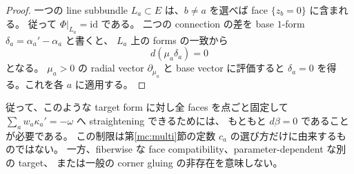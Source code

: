 \begin{proof}
一つの line subbundle $L_a\subset E$ は、$b\ne a$ を選べば face $\{z_b=0\}$ に含まれる。
従って $\Phi|_{L_a}=\mathrm{id}$ である。
二つの connection の差を base $1$-form $\delta_a=\alpha_a'-\alpha_a$ と書くと、
$L_a$ 上の forms の一致から
\[
 d(\mu_a\delta_a)=0
\]
となる。
$\mu_a>0$ の radial vector $\partial_{\mu_a}$ と base vector に評価すると
$\delta_a=0$ を得る。これを各 $a$ に適用する。
\end{proof}

従って、このような target form に対し全 faces を点ごと固定して
$\sum_aw_a\kappa_a'=-\omega$ へ straightening できるためには、
もともと $d\beta=0$ であることが必要である。
この制限は第\ref{mc:multi}節の定数 $c_a$ の選び方だけに由来するものではない。
一方、fiberwise な face compatibility、parameter-dependent な別の target、
または一般の corner gluing の非存在を意味しない。
